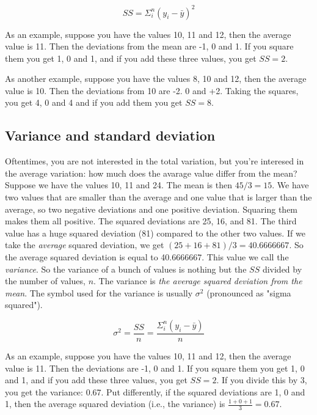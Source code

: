 \documentclass[]{report}\usepackage[]{graphicx}\usepackage[]{color}
\begin{document}
\begin{equation}
SS = \Sigma_i^n (y_i-\bar{y})^2
\end{equation}

As an example, suppose you have the values 10, 11 and 12, then the average value is 11. Then the deviations from the mean are -1, 0 and 1. If you square them you get 1, 0 and 1, and if you add these three values, you get $SS=2$.

As another example, suppose you have the values 8, 10 and 12, then the average value is 10. Then the deviations from 10 are -2. 0 and +2. Taking the squares, you get 4, 0 and 4 and if you add them you get $SS=8$.

\subsection{Variance and standard deviation}

Oftentimes, you are not interested in the total variation, but you're interesed in the average variation: how much does the avarage value differ from the mean? Suppose we have the values 10, 11 and 24. The mean is then $45/3=15$. We have two values that are smaller than the average and one value that is larger than the average, so two negative deviations and one positive deviation. Squaring them makes them all positive. The squared deviations are 25, 16, and 81. The third value has a huge squared deviation (81) compared to the other two values. If we take the \textit{average} squared deviation, we get $(25+16+81)/3= 40.6666667$. So the average squared deviation is equal to 40.6666667. This value we call the \textit{variance}. So the variance of a bunch of values is nothing but the $SS$ divided by the number of values, $n$. The variance is \textit{the average squared deviation from the mean}. The symbol used for the variance is usually $\sigma^2$ (pronounced as "sigma squared").

\begin{equation}
\sigma^2 = \frac{SS}{n}= \frac{\Sigma_i^n (y_i-\bar{y})}{n}
\end{equation}


As an example, suppose you have the values 10, 11 and 12, then the average value is 11. Then the deviations are -1, 0 and 1. If you square them you get 1, 0 and 1, and if you add these three values, you get $SS=2$. If you divide this by 3, you get the variance: 0.67. Put differently, if the squared deviations are 1, 0 and 1, then the average squared deviation (i.e., the variance) is $\frac{1+0+1}{3}=0.67$.
\end{document}

